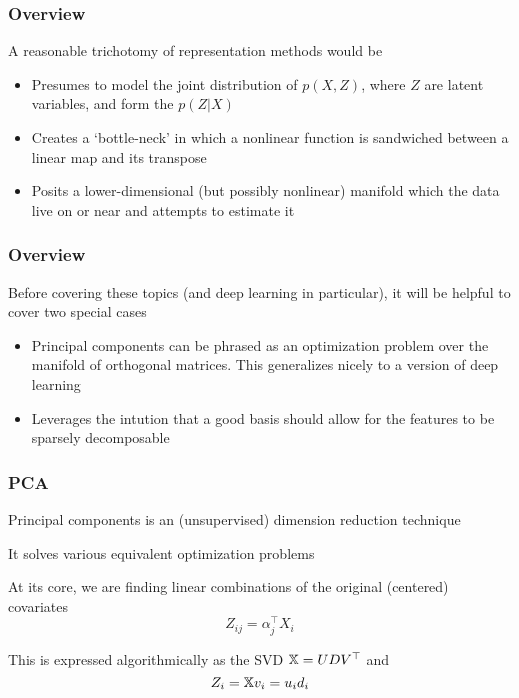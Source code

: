 \documentclass[12pt]{beamer}
\begin{document}
\begin{frame}[fragile]
\frametitle{Overview}
A reasonable trichotomy of representation methods would be
\begin{itemize}
\item {} Presumes to model the joint distribution of $p(X,Z)$, where $Z$
are latent variables, and form the  $p(Z|X)$ 

\item {} Creates a `bottle-neck' in which a nonlinear function is sandwiched between
a linear map and its transpose
\item {} Posits a lower-dimensional (but possibly nonlinear) manifold which the data live
on or near and attempts to estimate it
\end{itemize}

\end{frame}

\begin{frame}[fragile]
\frametitle{Overview}
Before covering these topics (and deep learning in particular), it will be helpful to cover two special cases

\begin{itemize}
\item {} Principal components can be phrased as an optimization problem
over the  manifold of orthogonal matrices.  This generalizes nicely to a version of deep learning

\item {} Leverages the intution that a good basis should allow for the 
features to be sparsely decomposable
\end{itemize}
\end{frame}

\begin{frame}[fragile]
\frametitle{PCA}
 Principal components is an (unsupervised) dimension reduction technique

\vsp
It solves various equivalent optimization problems


\vsp
At its core, we are finding linear combinations of the original (centered) covariates
\[
Z_{ij} = \alpha_j^{\top} X_i
\]

\vsp
This is expressed algorithmically as the SVD $\mathbb{X} = UDV^{\top}$ and
\[
Z_i = \mathbb{X} v_i = u_i d_i
\]
\end{frame}
\end{document}
